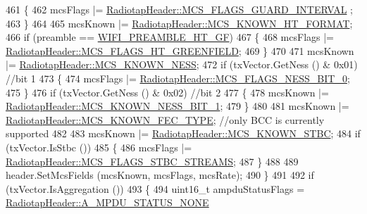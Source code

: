 \begin{DoxyCode}
461               \{
462                 mcsFlags |= \hyperlink{classns3_1_1RadiotapHeader_a81a58a7c4281df7ce21fb72c5ed181c3acc0e1e46ecea2243688341d5aa31fbb1}{RadiotapHeader::MCS\_FLAGS\_GUARD\_INTERVAL}
      ;
463               \}
464 
465             mcsKnown |= \hyperlink{classns3_1_1RadiotapHeader_aac7ef91c429fa95640a0e3a996b6741da8b123c61d88b5d740e29ed68fb61d167}{RadiotapHeader::MCS\_KNOWN\_HT\_FORMAT};
466             \textcolor{keywordflow}{if} (preamble == \hyperlink{group__wifi_gga5e94a56cb338a14ffbbb19c6a41251eba82e0b00d79c1f01b7a6e46b693bafd72}{WIFI\_PREAMBLE\_HT\_GF})
467               \{
468                 mcsFlags |= \hyperlink{classns3_1_1RadiotapHeader_a81a58a7c4281df7ce21fb72c5ed181c3ac8c45b1a0c60f92bf2f424f46373c87c}{RadiotapHeader::MCS\_FLAGS\_HT\_GREENFIELD};
469               \}
470 
471             mcsKnown |= \hyperlink{classns3_1_1RadiotapHeader_aac7ef91c429fa95640a0e3a996b6741da96922c704ba99acf6c306c79f89f02ff}{RadiotapHeader::MCS\_KNOWN\_NESS};
472             \textcolor{keywordflow}{if} (txVector.GetNess () & 0x01) \textcolor{comment}{//bit 1}
473               \{
474                 mcsFlags |= \hyperlink{classns3_1_1RadiotapHeader_a81a58a7c4281df7ce21fb72c5ed181c3a423ea5081ba934fb09932a665e19328e}{RadiotapHeader::MCS\_FLAGS\_NESS\_BIT\_0};
475               \}
476             \textcolor{keywordflow}{if} (txVector.GetNess () & 0x02) \textcolor{comment}{//bit 2}
477               \{
478                 mcsKnown |= \hyperlink{classns3_1_1RadiotapHeader_aac7ef91c429fa95640a0e3a996b6741da84245044e52f4f408a0001fb908caefa}{RadiotapHeader::MCS\_KNOWN\_NESS\_BIT\_1};
479               \}
480 
481             mcsKnown |= \hyperlink{classns3_1_1RadiotapHeader_aac7ef91c429fa95640a0e3a996b6741da15967fe34f7c63675c058d2832524c95}{RadiotapHeader::MCS\_KNOWN\_FEC\_TYPE}; \textcolor{comment}{//only BCC is
       currently supported}
482 
483             mcsKnown |= \hyperlink{classns3_1_1RadiotapHeader_aac7ef91c429fa95640a0e3a996b6741dafe3d106f243f1230cedd23df369445f9}{RadiotapHeader::MCS\_KNOWN\_STBC};
484             \textcolor{keywordflow}{if} (txVector.IsStbc ())
485               \{
486                 mcsFlags |= \hyperlink{classns3_1_1RadiotapHeader_a81a58a7c4281df7ce21fb72c5ed181c3a9d8a68f5220ee2e53e48ebb9f140103b}{RadiotapHeader::MCS\_FLAGS\_STBC\_STREAMS};
487               \}
488 
489             header.SetMcsFields (mcsKnown, mcsFlags, mcsRate);
490           \}
491 
492         \textcolor{keywordflow}{if} (txVector.IsAggregation ())
493           \{
494             uint16\_t ampduStatusFlags = \hyperlink{classns3_1_1RadiotapHeader_a9f8333ba19c8dc9ae63e7e03af87a557a223cc9f40442a69cce17a841b7c750dc}{RadiotapHeader::A\_MPDU\_STATUS\_NONE}

\end{DoxyCode}
